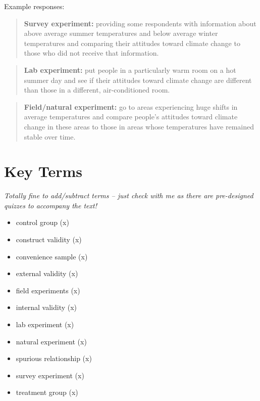 \documentclass{book}
\newenvironment{shaded*}{
    \begin{center}
    \begin{tabular}{|p{0.9\textwidth}|}
    \hline\\
    }
    { 
    \\\\\hline
    \end{tabular} 
    \end{center}
}
\begin{document}
\begin{shaded*}

Example responses:

\begin{quote}
\textbf{Survey experiment:} providing some respondents with information about
above average summer temperatures and below average winter temperatures and
comparing their attitudes toward climate change to those who did not receive
that information.
\end{quote}

\begin{quote}
\textbf{Lab experiment:} put people in a particularly warm room on a hot
summer day and see if their attitudes toward climate change are different than
those in a different, air-conditioned room.
\end{quote}

\begin{quote}
\textbf{Field/natural experiment:} go to areas experiencing huge shifts in
average temperatures and compare people's attitudes toward climate change in
these areas to those in areas whose temperatures have remained stable over
time.
\end{quote}

\end{shaded*}

\hypertarget{key-terms-4}{%
\section{Key Terms}\label{key-terms-4}}

\emph{Totally fine to add/subtract terms -- just check with me as there are
pre-designed quizzes to accompany the text!}

\begin{itemize}
\item
  control group (x)
\item
  construct validity (x)
\item
  convenience sample (x)
\item
  external validity (x)
\item
  field experiments (x)
\item
  internal validity (x)
\item
  lab experiment (x)
\item
  natural experiment (x)
\item
  spurious relationship (x)
\item
  survey experiment (x)
\item
  treatment group (x)
\end{itemize}
\end{document}
